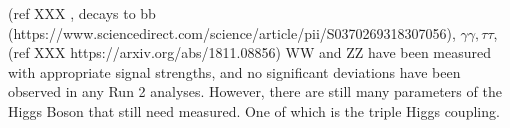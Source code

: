 (ref XXX %
, decays to bb (https://www.sciencedirect.com/science/article/pii/S0370269318307056), ${\gamma\gamma, \tau\tau}$,(ref XXX https://arxiv.org/abs/1811.08856) WW and ZZ have been measured with appropriate signal strengths, and no significant deviations have been observed in any Run 2 analyses. However, there are still many parameters of the Higgs Boson that still need measured. One of which is the triple Higgs coupling.
